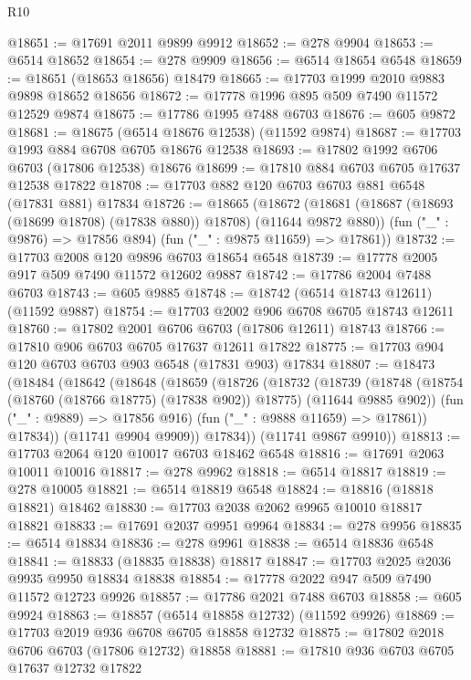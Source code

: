 \begin{lexlean}{R10}
\begin{coremodule}
@18651 := @17691 @2011 @9899 @9912
@18652 := @278 @9904
@18653 := @6514 @18652
@18654 := @278 @9909
@18656 := @6514 @18654 @6548
@18659 := @18651 (@18653 @18656) @18479
@18665 := @17703 @1999 @2010 @9883 @9898 @18652 @18656
@18672 := @17778 @1996 @895 @509 @7490 @11572 @12529 @9874
@18675 := @17786 @1995 @7488 @6703
@18676 := @605 @9872
@18681 := @18675 (@6514 @18676 @12538) (@11592 @9874)
@18687 := @17703 @1993 @884 @6708 @6705 @18676 @12538
@18693 := @17802 @1992 @6706 @6703 (@17806 @12538) @18676
@18699 := @17810 @884 @6703 @6705 @17637 @12538 @17822
@18708 := @17703 @882 @120 @6703 @6703 @881 @6548 (@17831 @881) @17834
@18726 := @18665
    (@18672
      (@18681 (@18687 (@18693 (@18699 @18708) (@17838 @880)) @18708) (@11644 @9872 @880))
      (fun ("_" : @9876) => @17856 @894)
      (fun ("_" : @9875 @11659) => @17861))
@18732 := @17703 @2008 @120 @9896 @6703 @18654 @6548
@18739 := @17778 @2005 @917 @509 @7490 @11572 @12602 @9887
@18742 := @17786 @2004 @7488 @6703
@18743 := @605 @9885
@18748 := @18742 (@6514 @18743 @12611) (@11592 @9887)
@18754 := @17703 @2002 @906 @6708 @6705 @18743 @12611
@18760 := @17802 @2001 @6706 @6703 (@17806 @12611) @18743
@18766 := @17810 @906 @6703 @6705 @17637 @12611 @17822
@18775 := @17703 @904 @120 @6703 @6703 @903 @6548 (@17831 @903) @17834
@18807 := @18473
    (@18484
      (@18642
        (@18648
          (@18659
            (@18726
              (@18732
                (@18739
                  (@18748
                    (@18754 (@18760 (@18766 @18775) (@17838 @902)) @18775)
                    (@11644 @9885 @902))
                  (fun ("_" : @9889) => @17856 @916)
                  (fun ("_" : @9888 @11659) => @17861))
                @17834))
            (@11741 @9904 @9909))
          @17834))
      (@11741 @9867 @9910))
@18813 := @17703 @2064 @120 @10017 @6703 @18462 @6548
@18816 := @17691 @2063 @10011 @10016
@18817 := @278 @9962
@18818 := @6514 @18817
@18819 := @278 @10005
@18821 := @6514 @18819 @6548
@18824 := @18816 (@18818 @18821) @18462
@18830 := @17703 @2038 @2062 @9965 @10010 @18817 @18821
@18833 := @17691 @2037 @9951 @9964
@18834 := @278 @9956
@18835 := @6514 @18834
@18836 := @278 @9961
@18838 := @6514 @18836 @6548
@18841 := @18833 (@18835 @18838) @18817
@18847 := @17703 @2025 @2036 @9935 @9950 @18834 @18838
@18854 := @17778 @2022 @947 @509 @7490 @11572 @12723 @9926
@18857 := @17786 @2021 @7488 @6703
@18858 := @605 @9924
@18863 := @18857 (@6514 @18858 @12732) (@11592 @9926)
@18869 := @17703 @2019 @936 @6708 @6705 @18858 @12732
@18875 := @17802 @2018 @6706 @6703 (@17806 @12732) @18858
@18881 := @17810 @936 @6703 @6705 @17637 @12732 @17822

\end{coremodule}
\end{lexlean}
